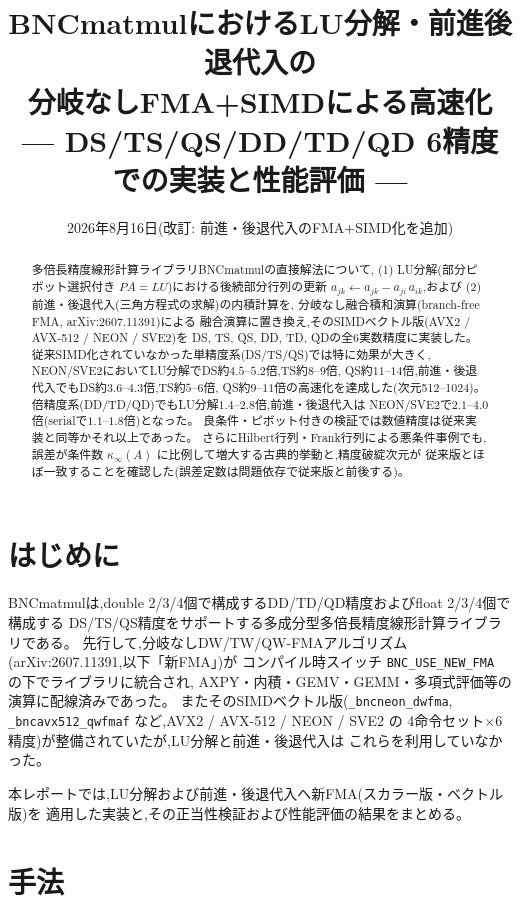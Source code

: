 \documentclass[a4j,dvipdfmx,11pt]{jsarticle}
\title{BNCmatmulにおけるLU分解・前進後退代入の\\分岐なしFMA+SIMDによる高速化\\
{\large --- DS/TS/QS/DD/TD/QD 6精度での実装と性能評価 ---}}
\author{}
\date{2026年8月16日(改訂: 前進・後退代入のFMA+SIMD化を追加)}
\begin{document}
\maketitle

\begin{abstract}
多倍長精度線形計算ライブラリBNCmatmulの直接解法について,
(1) LU分解(部分ピボット選択付き $PA=LU$)における後続部分行列の更新
$a_{jk} \leftarrow a_{jk} - a_{ji}\, a_{ik}$,および
(2) 前進・後退代入(三角方程式の求解)の内積計算を,
分岐なし融合積和演算(branch-free FMA, arXiv:2607.11391)による
融合演算に置き換え,そのSIMDベクトル版(AVX2 / AVX-512 / NEON / SVE2)を
DS, TS, QS, DD, TD, QDの全6実数精度に実装した。
従来SIMD化されていなかった単精度系(DS/TS/QS)では特に効果が大きく,
NEON/SVE2においてLU分解でDS約$4.5$--$5.2$倍,TS約$8$--$9$倍,
QS約$11$--$14$倍,前進・後退代入でもDS約$3.6$--$4.3$倍,TS約$5$--$6$倍,
QS約$9$--$11$倍の高速化を達成した(次元512--1024)。
倍精度系(DD/TD/QD)でもLU分解$1.4$--$2.8$倍,前進・後退代入は
NEON/SVE2で$2.1$--$4.0$倍(serialで$1.1$--$1.8$倍)となった。
良条件・ピボット付きの検証では数値精度は従来実装と同等かそれ以上であった。
さらにHilbert行列・Frank行列による悪条件事例でも,誤差が条件数
$\kappa_\infty(A)$ に比例して増大する古典的挙動と,精度破綻次元が
従来版とほぼ一致することを確認した(誤差定数は問題依存で従来版と前後する)。
\end{abstract}

\section{はじめに}

BNCmatmulは,double 2/3/4個で構成するDD/TD/QD精度およびfloat 2/3/4個で構成する
DS/TS/QS精度をサポートする多成分型多倍長精度線形計算ライブラリである。
先行して,分岐なしDW/TW/QW-FMAアルゴリズム(arXiv:2607.11391,以下「新FMA」)が
コンパイル時スイッチ \texttt{BNC\_USE\_NEW\_FMA} の下でライブラリに統合され,
AXPY・内積・GEMV・GEMM・多項式評価等の演算に配線済みであった。
またそのSIMDベクトル版(\texttt{\_bncneon\_dwfma},
\texttt{\_bncavx512\_qwfmaf} など,AVX2 / AVX-512 / NEON / SVE2 の
4命令セット$\times$6精度)が整備されていたが,LU分解と前進・後退代入は
これらを利用していなかった。

本レポートでは,LU分解および前進・後退代入へ新FMA(スカラー版・ベクトル版)を
適用した実装と,その正当性検証および性能評価の結果をまとめる。

\section{手法}
\end{document}
